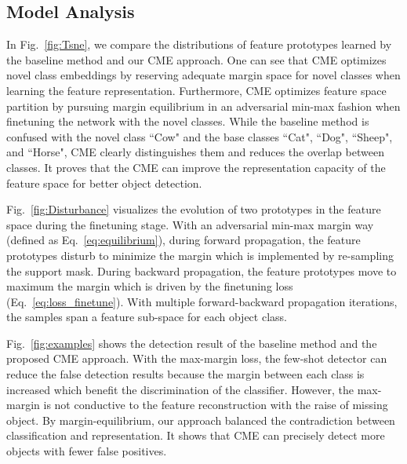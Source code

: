 \documentclass[final]{cvpr}
\begin{document}
\subsection{Model Analysis}
In Fig.\ \ref{fig:Tsne}, we compare the distributions of feature prototypes learned by the baseline method and our CME approach. One can see that CME optimizes novel class embeddings by reserving adequate margin space for novel classes when learning the feature representation. Furthermore, CME optimizes feature space partition by pursuing margin equilibrium in an adversarial min-max fashion when finetuning the network with the novel classes. While the baseline method is confused with the novel class ``Cow" and the base classes ``Cat", ``Dog", ``Sheep", and ``Horse", CME clearly distinguishes them and reduces the overlap between classes. It proves that the CME can improve the representation capacity of the feature space for better object detection. 

Fig.\ \ref{fig:Disturbance} visualizes the evolution of two prototypes in the feature space during the finetuning stage. With an adversarial min-max margin way (defined as Eq.\ \ref{eq:equilibrium}), during forward propagation, the feature prototypes disturb to minimize the margin which is implemented by re-sampling the support mask. During backward propagation, the feature prototypes move to maximum the margin which is driven by the finetuning loss (Eq.\ \ref{eq:loss_finetune}). With multiple forward-backward propagation iterations, the samples span a feature sub-space for each object class.

Fig.\ \ref{fig:examples} shows the detection result of the baseline method and the proposed CME approach. With the max-margin loss, the few-shot detector can reduce the false detection results because the margin between each class is increased which benefit the discrimination of the classifier. However, the max-margin is not conductive to the feature reconstruction with the raise of missing object. By margin-equilibrium, our approach balanced the contradiction between classification and representation. It shows that CME can precisely detect more objects with fewer false positives.

\begin{comment}
{\color{red}
Fig.\ \ref{fig:D_inter} shows the statistics of the inter-class distance $D_{Inter}$ and the difference of inter-class distance $D_{Inter}$ and intra-class distance $D_{Intra}$ between classes, $D_{inter}-D_{intra}$. According to Eq.\ \ref{eq:bound}, $D^{Inter}_{i,i^{'}}$ is the upper bound of the margin $\mathcal{M}_{i,i^{'}}$ between $i$-th class and $i^{'}$-th class while $D^{Inter}_{i,i^{'}}-D^{Intra}_{i}-D^{Intra}_{i^{'}}$ is the lower bound. With the max-margin loss, the inter-class distance increases which means that the upper bound of the margin increases. With the feature disturbance, the network is learned in an adversarial manner which decreases inter-class distance decreases towards class margin equilibrium.}
\end{comment}
\end{document}

